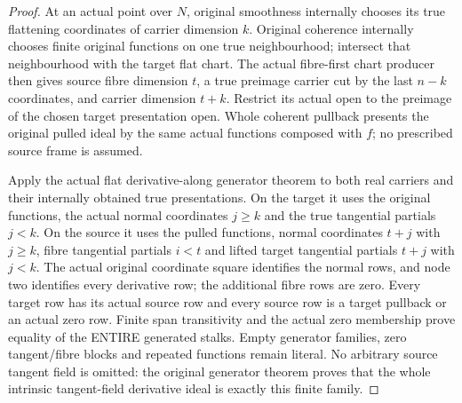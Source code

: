 \begin{proof}
At an actual point over $N$, original smoothness internally chooses its true
flattening coordinates of carrier dimension $k$. Original coherence internally
chooses finite original functions on one true neighbourhood; intersect that
neighbourhood with the target flat chart. The actual fibre-first chart producer
then gives source fibre dimension $t$, a true preimage carrier cut by the last
$n-k$ coordinates, and carrier dimension $t+k$. Restrict its actual open to
the preimage of the chosen target presentation open. Whole coherent pullback
presents the original pulled ideal by the same actual functions composed
with $f$; no prescribed source frame is assumed.

Apply the actual flat derivative-along generator theorem to both real
carriers and their internally obtained true presentations. On the target it
uses the original functions, the actual normal coordinates $j\ge k$ and
the true tangential partials $j<k$. On the source it uses the pulled functions,
normal coordinates $t+j$ with $j\ge k$, fibre tangential partials $i<t$ and
lifted target tangential partials $t+j$ with $j<k$. The actual original
coordinate square identifies the normal rows, and node two identifies every
derivative row; the additional fibre rows are zero. Every target row has its
actual source row and every source row is a target pullback or an actual zero
row. Finite span transitivity and the actual zero membership prove equality
of the ENTIRE generated stalks. Empty generator families, zero tangent/fibre
blocks and repeated functions remain literal. No arbitrary source tangent
field is omitted: the original generator theorem proves that the whole
intrinsic tangent-field derivative ideal is exactly this finite family.
\end{proof}

